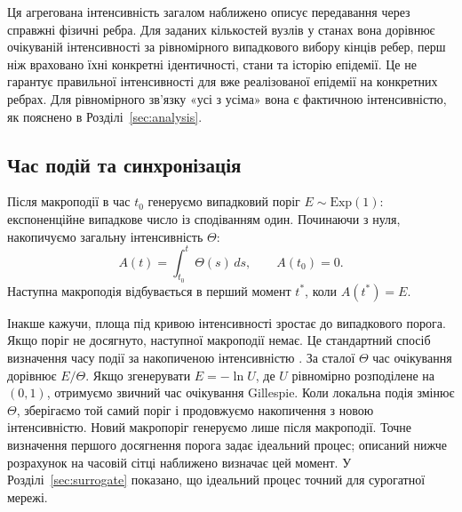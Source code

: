 \documentclass[a4paper,fleqn]{cas-sc}
\newcommand{\Exp}{\mathrm{Exp}}
\begin{document}
Ця агрегована інтенсивність загалом наближено описує передавання через справжні фізичні ребра. Для заданих кількостей вузлів у станах вона дорівнює очікуваній інтенсивності за рівномірного випадкового вибору кінців ребер, перш ніж враховано їхні конкретні ідентичності, стани та історію епідемії. Це не гарантує правильної інтенсивності для вже реалізованої епідемії на конкретних ребрах. Для рівномірного зв'язку «усі з усіма» вона є фактичною інтенсивністю, як пояснено в Розділі~\ref{sec:analysis}. 

\subsection{Час подій та синхронізація}
\label{sec:timing}

Після макроподії в час $t_0$ генеруємо випадковий поріг $E\sim\Exp(1)$: експоненційне випадкове число із сподіванням один. Починаючи з нуля, накопичуємо загальну інтенсивність $\Theta$:
\begin{equation}
\label{eq:hazard_integral}
A(t)=\int_{t_0}^{t}\Theta(s)\,ds,
\qquad A(t_0)=0.
\end{equation}
Наступна макроподія відбувається в перший момент
$t^\ast$, коли $A(t^\ast)=E$.


Інакше кажучи, площа під кривою інтенсивності зростає до випадкового порога. Якщо поріг не досягнуто, наступної макроподії немає. Це стандартний спосіб визначення часу події за накопиченою інтенсивністю \citep{ethier1986,anderson2007}. За сталої $\Theta$ час очікування дорівнює $E/\Theta$. Якщо згенерувати $E=-\ln U$, де $U$ рівномірно розподілене на $(0,1)$, отримуємо звичний час очікування Gillespie. Коли локальна подія змінює $\Theta$, зберігаємо той самий поріг і продовжуємо накопичення з новою інтенсивністю. Новий макропоріг генеруємо лише після макроподії. Точне визначення першого досягнення порога задає ідеальний процес; описаний нижче розрахунок на часовій сітці наближено визначає цей момент. У Розділі~\ref{sec:surrogate} показано, що ідеальний процес точний для сурогатної мережі.
\end{document}
